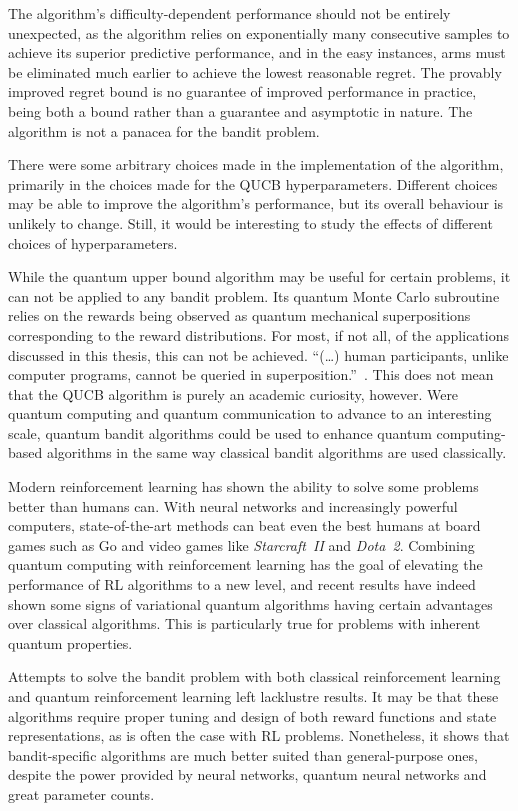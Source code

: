The algorithm's difficulty-dependent performance should not be entirely unexpected, as the algorithm relies on exponentially many consecutive samples to achieve its superior predictive performance, and in the easy instances, arms must be eliminated much earlier to achieve the lowest reasonable regret.
The provably improved regret bound is no guarantee of improved performance in practice, being both a bound rather than a guarantee and asymptotic in nature.
The algorithm is not a panacea for the bandit problem.

There were some arbitrary choices made in the implementation of the algorithm, primarily in the choices made for the QUCB hyperparameters.
Different choices may be able to improve the algorithm's performance, but its overall behaviour is unlikely to change.
Still, it would be interesting to study the effects of different choices of hyperparameters.

While the quantum upper bound algorithm may be useful for certain problems, it can not be applied to any bandit problem.
Its quantum Monte Carlo subroutine relies on the rewards being observed as quantum mechanical superpositions corresponding to the reward distributions.
For most, if not all, of the applications discussed in this thesis, this can not be achieved.
\enquote{(\dots) human participants, unlike computer programs, cannot be queried in superposition.}~\autocite{wang2021}.
This does not mean that the QUCB algorithm is purely an academic curiosity, however.
Were quantum computing and quantum communication to advance to an interesting scale, quantum bandit algorithms could be used to enhance quantum computing-based algorithms in the same way classical bandit algorithms are used classically.

Modern reinforcement learning has shown the ability to solve some problems better than humans can.
With neural networks and increasingly powerful computers, state-of-the-art methods can beat even the best humans at board games such as Go and video games like \textit{Starcraft~II} and \textit{Dota~2}.
Combining quantum computing with reinforcement learning has the goal of elevating the performance of RL algorithms to a new level, and recent results have indeed shown some signs of variational quantum algorithms having certain advantages over classical algorithms.
This is particularly true for problems with inherent quantum properties.

Attempts to solve the bandit problem with both classical reinforcement learning and quantum reinforcement learning left lacklustre results.
It may be that these algorithms require proper tuning and design of both reward functions and state representations, as is often the case with RL problems.
Nonetheless, it shows that bandit-specific algorithms are much better suited than general-purpose ones, despite the power provided by neural networks, quantum neural networks and great parameter counts.

